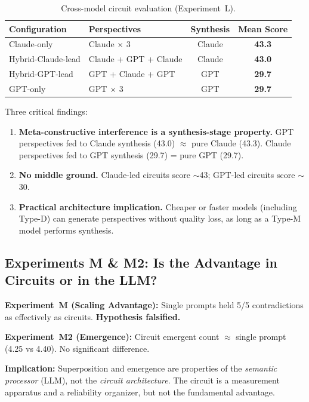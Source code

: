 \documentclass[11pt,a4paper]{article}
\begin{document}
\begin{table}[H]
\centering
\caption{Cross-model circuit evaluation (Experiment~L).}
\begin{tabular}{llcc}
\toprule
\textbf{Configuration} & \textbf{Perspectives} & \textbf{Synthesis} & \textbf{Mean Score} \\
\midrule
Claude-only             & Claude $\times$ 3     & Claude & \textbf{43.3} \\
Hybrid-Claude-lead      & Claude + GPT + Claude & Claude & \textbf{43.0} \\
Hybrid-GPT-lead         & GPT + Claude + GPT    & GPT    & \textbf{29.7} \\
GPT-only                & GPT $\times$ 3        & GPT    & \textbf{29.7} \\
\bottomrule
\end{tabular}
\label{tab:cross-model}
\end{table}

Three critical findings:
\begin{enumerate}
\item \textbf{Meta-constructive interference is a synthesis-stage property.} GPT perspectives fed to Claude synthesis (43.0) $\approx$ pure Claude (43.3). Claude perspectives fed to GPT synthesis (29.7) = pure GPT (29.7).
\item \textbf{No middle ground.} Claude-led circuits score $\sim$43; GPT-led circuits score $\sim$30.
\item \textbf{Practical architecture implication.} Cheaper or faster models (including Type-D) can generate perspectives without quality loss, as long as a Type-M model performs synthesis.
\end{enumerate}

\subsection{Experiments M \& M2: Is the Advantage in Circuits or in the LLM?}

\textbf{Experiment~M (Scaling Advantage):} Single prompts held 5/5 contradictions as effectively as circuits. \textbf{Hypothesis falsified.}

\textbf{Experiment~M2 (Emergence):} Circuit emergent count $\approx$ single prompt (4.25 vs 4.40). No significant difference.

\textbf{Implication:} Superposition and emergence are properties of the \emph{semantic processor} (LLM), not the \emph{circuit architecture}. The circuit is a measurement apparatus and a reliability organizer, but not the fundamental advantage.
\end{document}
